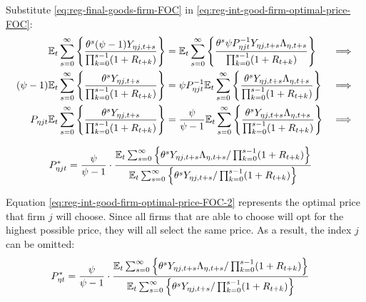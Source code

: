 \documentclass[../thesis.tex]{subfiles}
\begin{document}
Substitute \ref{eq:reg-final-goods-firm-FOC} in \ref{eq:reg-int-good-firm-optimal-price-FOC}:
\begin{alignat}{2}
	{\mathbb{E}_{t}} \sum_{s=0}^{\infty} \Bigg\{ \frac{\theta^s (\psi-1) Y_{\eta j,t+s}}{\prod_{k=0}^{s-1}(1+R_{t+k})} \Bigg\} &= {\mathbb{E}_{t}} \sum_{s=0}^{\infty} \Bigg\{ \frac{\theta^s \psi P_{\eta jt}^{-1} Y_{\eta j,t+s} \Lambda_{\eta, t+s}}{\prod_{k=0}^{s-1}(1+R_{t+k})}  \Bigg\} &\implies \nonumber \\
	(\psi-1) {\mathbb{E}_{t}} \sum_{s=0}^{\infty} \Bigg\{ \frac{\theta^s Y_{\eta j,t+s}}{\prod_{k=0}^{s-1}(1+R_{t+k})} \Bigg\} &= \psi P_{\eta jt}^{-1} {\mathbb{E}_{t}} \sum_{s=0}^{\infty} \Bigg\{ \frac{\theta^s Y_{\eta j,t+s} \Lambda_{\eta, t+s}}{\prod_{k=0}^{s-1}(1+R_{t+k})}  \Bigg\} &\implies \nonumber \\
	P_{\eta jt} {\mathbb{E}_{t}} \sum_{s=0}^{\infty} \Bigg\{ \frac{\theta^s Y_{\eta j,t+s}}{\prod_{k=0}^{s-1}(1+R_{t+k})} \Bigg\} &= \frac{\psi}{\psi-1} {\mathbb{E}_{t}} \sum_{s=0}^{\infty} \Bigg\{ \frac{\theta^s Y_{\eta j,t+s} \Lambda_{\eta, t+s}}{\prod_{k=0}^{s-1}(1+R_{t+k})}  \Bigg\} &\implies \nonumber
\end{alignat}

\vspace*{-1cm}

\begin{align}
	\label{eq:reg-int-good-firm-optimal-price-FOC-2}
	P_{\eta jt}^{\ast} &= 
	\frac{\psi}{\psi-1} \cdot
	\frac{
		{\mathbb{E}_{t}} \sum_{s=0}^{\infty} \left\{ 
		\theta^s Y_{\eta j,t+s} \Lambda_{\eta, t+s} / \prod_{k=0}^{s-1}(1+R_{t+k}) \right\}} {{\mathbb{E}_{t}} \sum_{s=0}^{\infty} \left\{
		\theta^s Y_{\eta j,t+s} / \prod_{k=0}^{s-1}(1+R_{t+k}) \right\}}
\end{align}


Equation \ref{eq:reg-int-good-firm-optimal-price-FOC-2} represents the optimal price that firm $j$ will choose. Since all firms that are able to choose will opt for the highest possible price, they will all select the same price. As a result, the index $j$ can be omitted:
\begin{align}
	\label{eq:reg-int-good-firm-optimal-price-FOC-3}
	P_{\eta t}^{\ast} &= 
	\frac{\psi}{\psi-1} \cdot
	\frac{
		{\mathbb{E}_{t}} \sum_{s=0}^{\infty} \left\{ 
		\theta^s Y_{\eta j,t+s} \Lambda_{\eta, t+s} / \prod_{k=0}^{s-1}(1+R_{t+k}) \right\}} {{\mathbb{E}_{t}} \sum_{s=0}^{\infty} \left\{
		\theta^s Y_{\eta j,t+s} / \prod_{k=0}^{s-1}(1+R_{t+k}) \right\}}
\end{align}

\end{document}
